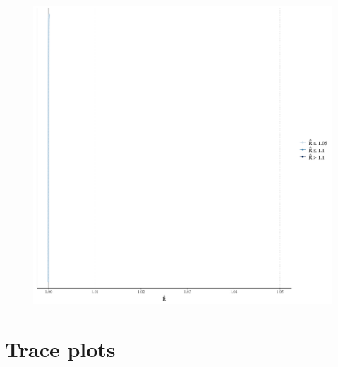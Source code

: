 \documentclass[
]{report}
\begin{document}
\begin{figure}

{\centering \includegraphics[width=1\textwidth,height=\textheight]{diagnostic_plots_files/figure-pdf/unnamed-chunk-28-1.pdf}

}

\end{figure}

\hypertarget{trace-plots-9}{%
\section{Trace plots}\label{trace-plots-9}}
\end{document}
